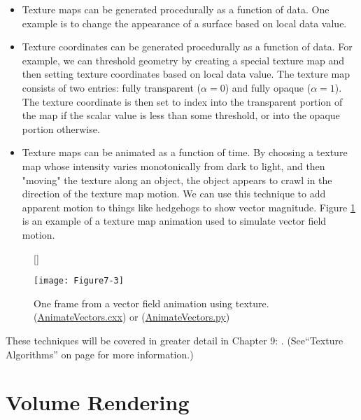 \begin{itemize}

	\item Texture maps can be generated procedurally as a function of data. One example is to change the appearance of a surface based on local data value.

	\item Texture coordinates can be generated procedurally as a function of data. For example, we can threshold geometry by creating a special texture map and then setting texture coordinates based on local data value. The texture map consists of two entries: fully transparent ($\alpha = 0$) and fully opaque ($\alpha = 1$). The texture coordinate is then set to index into the transparent portion of the map if the scalar value is less than some threshold, or into the opaque portion otherwise.

	\item Texture maps can be animated as a function of time. By choosing a texture map whose intensity varies monotonically from dark to light, and then "moving" the texture along an object, the object appears to crawl in the direction of the texture map motion. We can use this technique to add apparent motion to things like hedgehogs to show vector magnitude. Figure \ref{fig:Figure7-3} is an example of a texture map animation used to simulate vector field motion.

\end{itemize}

\begin{figure}[!htb]
	[\FBwidth]
	{\caption{One frame from a vector field animation using texture.(\href{https://lorensen.github.io/VTKExamples/site/Cxx/Texture/AnimateVectors/}{AnimateVectors.cxx}) or (\href{https://lorensen.github.io/VTKExamples/site/Python/Texture/AnimateVectors/}{AnimateVectors.py})}\label{fig:Figure7-3}}
	{\texttt{[image: Figure7-3]}}
\end{figure}

These techniques will be covered in greater detail in Chapter 9: . (See``Texture Algorithms'' on page \pageref{subsec:texture_algorithms} for more information.)


\section{Volume Rendering}
\label{sec:volume_rendering}


